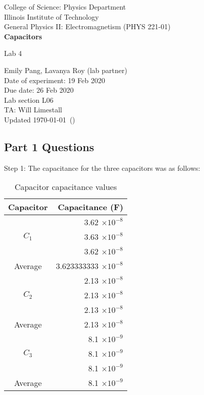 \documentclass [12pt, letterpaper, twoside] {article}
\begin{document}
\begin {titlepage}
\begin {center}
College of Science: Physics Department \\
\vspace {0.1cm}
Illinois Institute of Technology \\
\vspace {0.1cm}
General Physics II: Electromagnetism (PHYS 221-01) \\
\vspace* {\fill}
\begingroup
\Large
\textbf {Capacitors}
\vspace {0.35cm}

\normalsize
Lab 4
\vspace {1.5cm}
\endgroup
\vspace* {\fill}
\end {center}

\vspace*{\fill}
\begin {flushright}
\footnotesize
Emily Pang, Lavanya Roy (lab partner) \\
Date of experiment: 19 Feb 2020 \\
Due date: 26 Feb 2020 \\
Lab section L06 \\
TA: Will Limestall \\
Updated \usdate\today~(\currenttime)
\end {flushright}
\end {titlepage}

\subsection* {Part 1 Questions}
Step 1:
The capacitance for the three capacitors was as follows:

\begin{table}[h!]
  \centering
  \begin{tabular}{| c | r |}
    \hline\hline
    Capacitor & Capacitance (F) \\
    \hline
    \multirow {3}{*}{\(C_{1}\)} & 3.62 \(\times{10}^{-8}\) \\
    & 3.63 \(\times{10}^{-8}\) \\
    & 3.62 \(\times{10}^{-8}\) \\
    \hline
    Average & 3.623333333 \(\times{10}^{-8}\) \\
    \hline
    \multirow {3}{*}{\(C_{2}\)} & 2.13 \(\times{10}^{-8}\) \\
    & 2.13 \(\times{10}^{-8}\) \\
    & 2.13 \(\times{10}^{-8}\) \\
    \hline
    Average & 2.13 \(\times{10}^{-8}\) \\
    \hline
    \multirow {3}{*}{\(C_{3}\)} & 8.1 \(\times{10}^{-9}\) \\
    & 8.1 \(\times{10}^{-9}\) \\
    & 8.1 \(\times{10}^{-9}\) \\
    \hline
    Average & 8.1 \(\times{10}^{-9}\) \\
    \hline\hline
  \end{tabular}
  \caption{Capacitor capacitance values}
\end{table}
\end{document}
